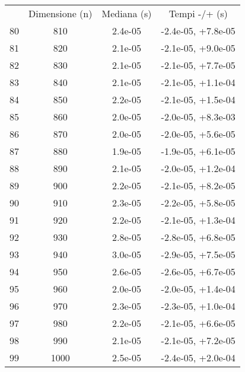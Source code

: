 \begin{table}
\centering
\begin{adjustbox}{width=1\textwidth/2}
\begin{tabular}{|c|c|c|c|}
\hline
 & Dimensione (n) & Mediana (s) & Tempi -/+ (s) \\
80 & 810 & 2.4e-05 & -2.4e-05, +7.8e-05 \\
\cline{1-4}
81 & 820 & 2.1e-05 & -2.1e-05, +9.0e-05 \\
\cline{1-4}
82 & 830 & 2.1e-05 & -2.1e-05, +7.7e-05 \\
\cline{1-4}
83 & 840 & 2.1e-05 & -2.1e-05, +1.1e-04 \\
\cline{1-4}
84 & 850 & 2.2e-05 & -2.1e-05, +1.5e-04 \\
\cline{1-4}
85 & 860 & 2.0e-05 & -2.0e-05, +8.3e-03 \\
\cline{1-4}
86 & 870 & 2.0e-05 & -2.0e-05, +5.6e-05 \\
\cline{1-4}
87 & 880 & 1.9e-05 & -1.9e-05, +6.1e-05 \\
\cline{1-4}
88 & 890 & 2.1e-05 & -2.0e-05, +1.2e-04 \\
\cline{1-4}
89 & 900 & 2.2e-05 & -2.1e-05, +8.2e-05 \\
\cline{1-4}
90 & 910 & 2.3e-05 & -2.2e-05, +5.8e-05 \\
\cline{1-4}
91 & 920 & 2.2e-05 & -2.1e-05, +1.3e-04 \\
\cline{1-4}
92 & 930 & 2.8e-05 & -2.8e-05, +6.8e-05 \\
\cline{1-4}
93 & 940 & 3.0e-05 & -2.9e-05, +7.5e-05 \\
\cline{1-4}
94 & 950 & 2.6e-05 & -2.6e-05, +6.7e-05 \\
\cline{1-4}
95 & 960 & 2.0e-05 & -2.0e-05, +1.4e-04 \\
\cline{1-4}
96 & 970 & 2.3e-05 & -2.3e-05, +1.0e-04 \\
\cline{1-4}
97 & 980 & 2.2e-05 & -2.1e-05, +6.6e-05 \\
\cline{1-4}
98 & 990 & 2.1e-05 & -2.1e-05, +7.2e-05 \\
\cline{1-4}
99 & 1000 & 2.5e-05 & -2.4e-05, +2.0e-04 \\
\cline{1-4}
\end{tabular}
\end{adjustbox}
\end{table}

